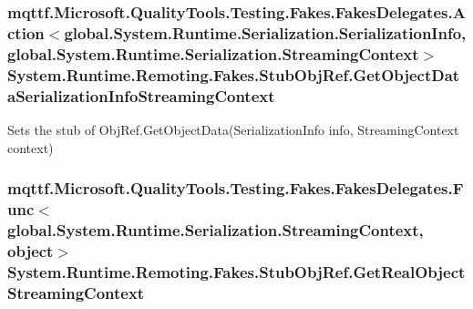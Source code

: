 \hypertarget{class_system_1_1_runtime_1_1_remoting_1_1_fakes_1_1_stub_obj_ref_ac859b95261c37020b385ecb41b0151bc}{
\subsubsection[{Get\-Object\-Data\-Serialization\-Info\-Streaming\-Context}]{\setlength{\rightskip}{0pt plus 5cm}mqttf.\-Microsoft.\-Quality\-Tools.\-Testing.\-Fakes.\-Fakes\-Delegates.\-Action$<$global.\-System.\-Runtime.\-Serialization.\-Serialization\-Info, global.\-System.\-Runtime.\-Serialization.\-Streaming\-Context$>$ System.\-Runtime.\-Remoting.\-Fakes.\-Stub\-Obj\-Ref.\-Get\-Object\-Data\-Serialization\-Info\-Streaming\-Context}}\label{class_system_1_1_runtime_1_1_remoting_1_1_fakes_1_1_stub_obj_ref_ac859b95261c37020b385ecb41b0151bc}


Sets the stub of Obj\-Ref.\-Get\-Object\-Data(\-Serialization\-Info info, Streaming\-Context context)

\hypertarget{class_system_1_1_runtime_1_1_remoting_1_1_fakes_1_1_stub_obj_ref_a8d23ffcec270721a96c7868d54c71ab1}{
\subsubsection[{Get\-Real\-Object\-Streaming\-Context}]{\setlength{\rightskip}{0pt plus 5cm}mqttf.\-Microsoft.\-Quality\-Tools.\-Testing.\-Fakes.\-Fakes\-Delegates.\-Func$<$global.\-System.\-Runtime.\-Serialization.\-Streaming\-Context, object$>$ System.\-Runtime.\-Remoting.\-Fakes.\-Stub\-Obj\-Ref.\-Get\-Real\-Object\-Streaming\-Context}}\label{class_system_1_1_runtime_1_1_remoting_1_1_fakes_1_1_stub_obj_ref_a8d23ffcec270721a96c7868d54c71ab1}


